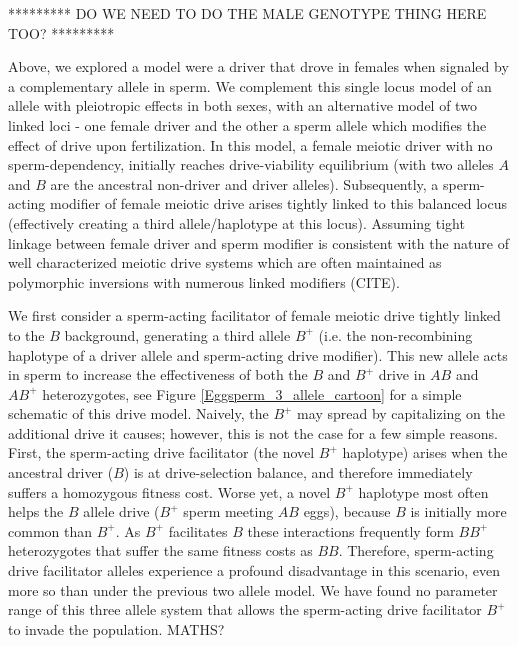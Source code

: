 \documentclass[12pt,letterpaper]{article}
\newcommand{\yb}[1]{{ \color{blue} #1}}
\begin{document}
\yb{********* DO WE NEED TO DO THE MALE GENOTYPE THING HERE TOO? *********}

Above, we explored a model were a driver that drove in females when signaled by a complementary allele in sperm.  
We complement this single locus model of an allele with pleiotropic effects in both sexes, 
 with  an alternative model of two linked loci - one female driver and the other a sperm allele which modifies the effect of drive upon fertilization. 
In this model, a female meiotic driver with no sperm-dependency, initially reaches drive-viability equilibrium (with two alleles
$A$ and $B$ are the ancestral non-driver and driver alleles).
Subsequently, a sperm-acting modifier of female meiotic drive arises tightly
        linked to this balanced locus (effectively creating a third
        allele/haplotype at this locus).
Assuming tight linkage between female driver and sperm modifier is consistent with the nature of well characterized meiotic drive systems 
	which are often maintained as polymorphic inversions with numerous linked modifiers (CITE).



We first consider a sperm-acting facilitator of
	female meiotic drive tightly linked to the $B$ background, 
	generating a third allele $B^{+}$ (i.e. the non-recombining haplotype of a
        driver allele and sperm-acting drive modifier). 
This new allele acts in sperm to increase the effectiveness of both
	the $B$ and  $B^{+}$ drive in $AB$ and $AB^{+}$ heterozygotes, see Figure \ref{Eggsperm_3_allele_cartoon} 
	for a simple schematic of this drive model.  
Naively, the $B^{+}$ may spread by capitalizing on the additional drive it causes; however,  
	this is not the case for a few simple reasons. 
First, the sperm-acting drive facilitator (the novel $B^{+}$ haplotype) 
	arises when the ancestral driver ($B$) is at drive-selection balance, 
	and therefore immediately suffers a homozygous fitness cost.  
Worse yet, a novel $B^{+}$ haplotype most often helps 
	the $B$  allele drive ($B^+$ sperm meeting $AB$ eggs), because $B$ is initially more common than $B^{+}$. 
As $B^{+}$ facilitates $B$ these interactions frequently form 
	$BB^{+}$ heterozygotes that suffer the same fitness costs as $BB$. 
Therefore, sperm-acting drive facilitator alleles experience a profound disadvantage 
	in this scenario, even more so than under the previous two allele model. 
We have found no parameter range of this
	three allele system that allows the sperm-acting drive facilitator $B^{+}$ to
	invade the population. \yb{MATHS?}
\end{document}
